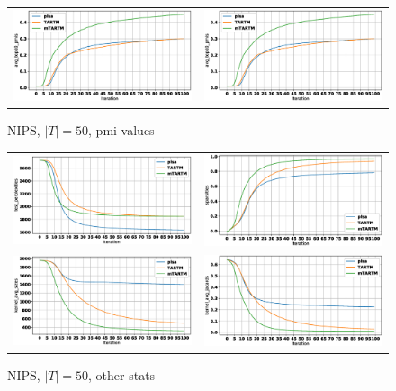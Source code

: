 \documentclass[12pt]{article}
\begin{document}
\begin{figure}[htb]
\centering
  \begin{tabular}{@{}cc@{}}
    \includegraphics[width=.5\linewidth]{pictures/NIPS_50t_avg_top10_pmis.eps} &
    \includegraphics[width=.5\linewidth]{pictures/NIPS_50t_avg_top10_pmis.eps} 
  \end{tabular}
  \caption{NIPS, $|T| = 50$, pmi values}
\end{figure}

\begin{figure}[htb]
\centering
  \begin{tabular}{@{}cc@{}}
    \includegraphics[width=.5\linewidth]{pictures/NIPS_50t_test_perplexities.eps} &
    \includegraphics[width=.5\linewidth]{pictures/NIPS_50t_sparsities.eps} \\
    \includegraphics[width=.5\linewidth]{pictures/NIPS_50t_kernel_avg_sizes.eps} &
    \includegraphics[width=.5\linewidth]{pictures/NIPS_50t_kernel_avg_jacards.eps} \\
  \end{tabular}
  \caption{NIPS, $|T| = 50$, other stats}
\end{figure}
\end{document}
